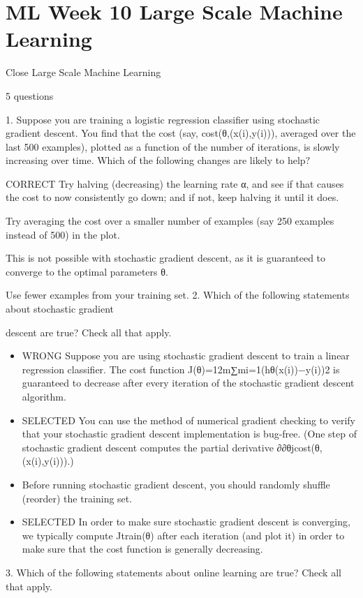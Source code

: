 \documentclass[11pt]{article} %
\begin{document}
\section*{ML Week 10 Large Scale Machine Learning}

Close
Large Scale Machine Learning

5 questions

1. 
Suppose you are training a logistic regression classifier using stochastic gradient descent. You find that the cost (say, cost(θ,(x(i),y(i))), averaged over the last 500 examples), plotted as a function of the number of iterations, is slowly increasing over time. Which of the following changes are likely to help?

CORRECT  Try halving (decreasing) the learning rate α, and see if that causes the cost to now consistently go down; and if not, keep halving it until it does.

Try averaging the cost over a smaller number of examples (say 250 examples instead of 500) in the plot.

This is not possible with stochastic gradient descent, as it is guaranteed to converge to the optimal parameters θ.

Use fewer examples from your training set.
2. 
Which of the following statements about stochastic gradient

descent are true? Check all that apply.

\begin{itemize}
\item WRONG Suppose you are using stochastic gradient descent to train a linear regression classifier. The cost function J(θ)=12m∑mi=1(hθ(x(i))−y(i))2 is guaranteed to decrease after every iteration of the stochastic gradient descent algorithm.
\item 
SELECTED You can use the method of numerical gradient checking to verify that your stochastic gradient descent implementation is bug-free. (One step of stochastic gradient descent computes the partial derivative ∂∂θjcost(θ,(x(i),y(i))).)
\item
Before running stochastic gradient descent, you should randomly shuffle (reorder) the training set.
\item 
SELECTED In order to make sure stochastic gradient descent is converging, we typically compute Jtrain(θ) after each iteration (and plot it) in order to make sure that the cost function is generally decreasing.
\end{itemize}
3. 
Which of the following statements about online learning are true? Check all that apply.
\end{document}
